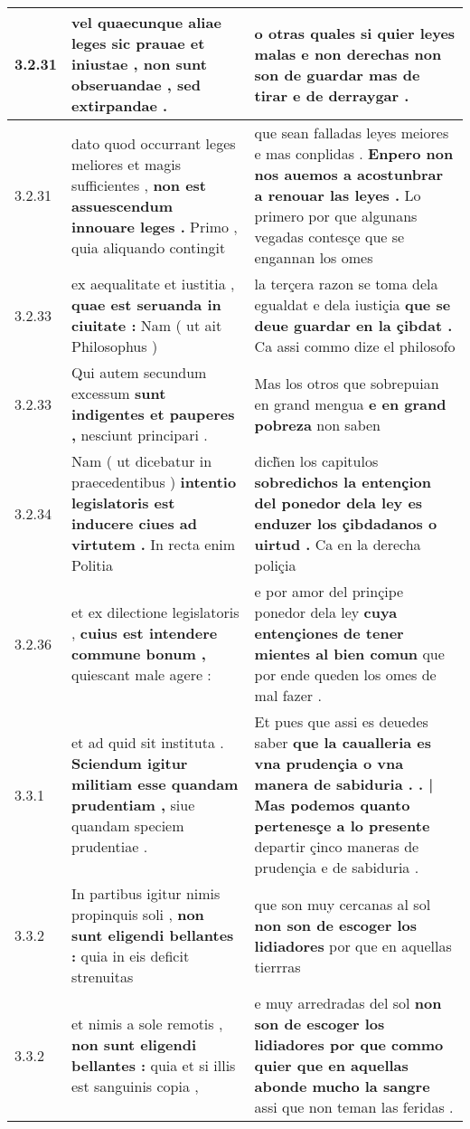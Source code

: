 \begin{tabular}{|p{1cm}|p{6.5cm}|p{6.5cm}|}
3.2.31 & vel quaecunque aliae leges sic prauae et iniustae , \textbf{ non sunt obseruandae , } sed extirpandae . & o otras quales si quier leyes malas \textbf{ e non derechas non son de guardar } mas de tirar e de derraygar . \\\hline
3.2.31 & dato quod occurrant leges meliores et magis sufficientes , \textbf{ non est assuescendum innouare leges . } Primo , quia aliquando contingit & que sean falladas leyes meiores e mas conplidas . \textbf{ Enpero non nos auemos a acostunbrar a renouar las leyes . } Lo primero por que algunans vegadas contesçe que se engannan los omes \\\hline
3.2.33 & ex aequalitate et iustitia , \textbf{ quae est seruanda in ciuitate : } Nam ( ut ait Philosophus ) & la terçera razon se toma dela egualdat e dela iustiçia \textbf{ que se deue guardar en la çibdat . } Ca assi commo dize el philosofo \\\hline
3.2.33 & Qui autem secundum excessum \textbf{ sunt indigentes et pauperes , } nesciunt principari . & Mas los otros que sobrepuian en grand mengua \textbf{ e en grand pobreza } non saben \\\hline
3.2.34 & Nam ( ut dicebatur in praecedentibus ) \textbf{ intentio legislatoris est inducere ciues ad virtutem . } In recta enim Politia & dich̃en los capitulos \textbf{ sobredichos la entençion del ponedor dela ley es enduzer los çibdadanos o uirtud . } Ca en la derecha poliçia \\\hline
3.2.36 & et ex dilectione legislatoris , \textbf{ cuius est intendere commune bonum , } quiescant male agere : & e por amor del prinçipe ponedor dela ley \textbf{ cuya entençiones de tener mientes al bien comun } que por ende queden los omes de mal fazer . \\\hline
3.3.1 & et ad quid sit instituta . \textbf{ Sciendum igitur militiam esse quandam prudentiam , } siue quandam speciem prudentiae . & Et pues que assi es deuedes saber \textbf{ que la caualleria es vna prudençia o vna manera de sabiduria . . | Mas podemos quanto pertenesçe a lo presente } departir çinco maneras de prudençia e de sabiduria . \\\hline
3.3.2 & In partibus igitur nimis propinquis soli , \textbf{ non sunt eligendi bellantes : } quia in eis deficit strenuitas & que son muy cercanas al sol \textbf{ non son de escoger los lidiadores } por que en aquellas tierrras \\\hline
3.3.2 & et nimis a sole remotis , \textbf{ non sunt eligendi bellantes : } quia et si illis est sanguinis copia , & e muy arredradas del sol \textbf{ non son de escoger los lidiadores por que commo quier que en aquellas abonde mucho la sangre } assi que non teman las feridas . \\\hline

\end{tabular}
